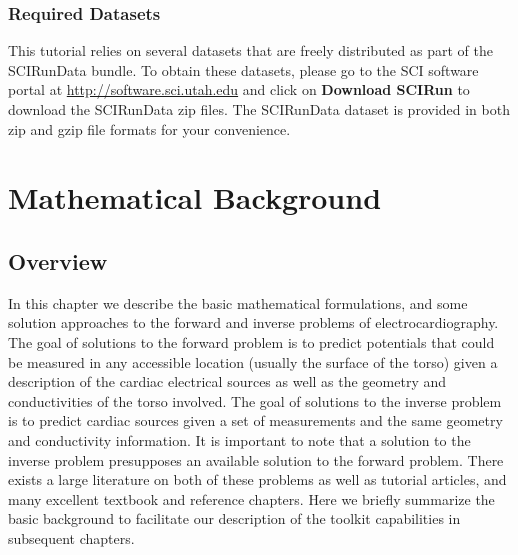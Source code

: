 \documentclass[fleqn,11pt,openany]{book}
\begin{document}
\subsection{Required Datasets}

This tutorial relies on several datasets that are freely distributed as part of the
SCIRunData bundle. To obtain these datasets, please go to the SCI
software portal at \newline\href{http://software.sci.utah.edu}{http://software.sci.utah.edu} and click on {\bf
Download SCIRun} to download the SCIRunData zip files. The SCIRunData
dataset is provided in both zip and gzip file formats for your convenience.

%
\chapter{Mathematical Background} \label{sec:ch1}

\section{Overview}

In this chapter we describe the basic mathematical formulations, and some
solution approaches to the forward and inverse problems of
electrocardiography. The goal of solutions to the forward problem is to
predict potentials that could be measured in any accessible location
(usually the surface of the torso) given a description of the cardiac
electrical sources as well as the geometry and conductivities of the torso involved. The goal of
solutions to the inverse problem is to predict cardiac sources given a set
of measurements and the same geometry and conductivity information. It is
important to note that a solution to the inverse problem presupposes an
available solution to the forward problem. There exists a large literature on
both of these problems as well as tutorial articles, and many excellent textbook
and reference chapters. Here we briefly summarize the
basic background to facilitate our description of the toolkit capabilities
in subsequent chapters.
\end{document}
